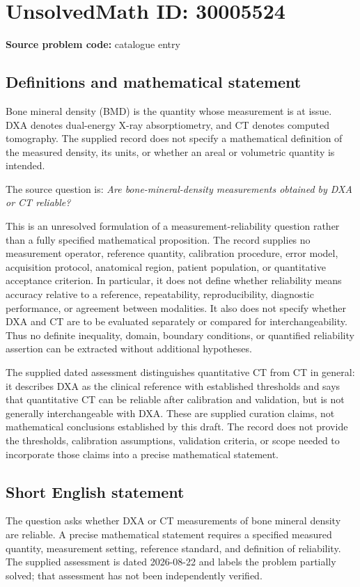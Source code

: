 \documentclass[11pt]{article}
\begin{document}
\section*{UnsolvedMath ID: 30005524}
\textbf{Source problem code:} catalogue entry
\subsection{Definitions and mathematical statement}
Bone mineral density (BMD) is the quantity whose measurement is at issue. DXA denotes dual-energy X-ray absorptiometry, and CT denotes computed tomography. The supplied record does not specify a mathematical definition of the measured density, its units, or whether an areal or volumetric quantity is intended.

The source question is: \emph{Are bone-mineral-density measurements obtained by DXA or CT reliable?}

This is an unresolved formulation of a measurement-reliability question rather than a fully specified mathematical proposition. The record supplies no measurement operator, reference quantity, calibration procedure, error model, acquisition protocol, anatomical region, patient population, or quantitative acceptance criterion. In particular, it does not define whether reliability means accuracy relative to a reference, repeatability, reproducibility, diagnostic performance, or agreement between modalities. It also does not specify whether DXA and CT are to be evaluated separately or compared for interchangeability. Thus no definite inequality, domain, boundary conditions, or quantified reliability assertion can be extracted without additional hypotheses.

The supplied dated assessment distinguishes quantitative CT from CT in general: it describes DXA as the clinical reference with established thresholds and says that quantitative CT can be reliable after calibration and validation, but is not generally interchangeable with DXA. These are supplied curation claims, not mathematical conclusions established by this draft. The record does not provide the thresholds, calibration assumptions, validation criteria, or scope needed to incorporate those claims into a precise mathematical statement.
\subsection{Short English statement}
The question asks whether DXA or CT measurements of bone mineral density are reliable. A precise mathematical statement requires a specified measured quantity, measurement setting, reference standard, and definition of reliability. The supplied assessment is dated 2026-08-22 and labels the problem partially solved; that assessment has not been independently verified.
\end{document}
